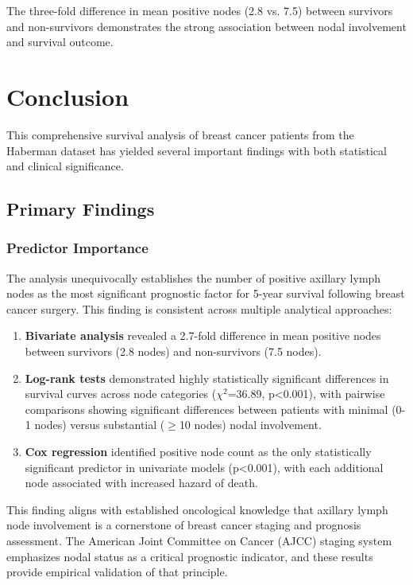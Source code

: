\documentclass[12pt,a4paper]{article}
\begin{document}
The three-fold difference in mean positive nodes (2.8 vs. 7.5) between survivors and non-survivors demonstrates the strong association between nodal involvement and survival outcome.


\section{Conclusion}

This comprehensive survival analysis of breast cancer patients from the Haberman dataset has yielded several important findings with both statistical and clinical significance.

\subsection{Primary Findings}

\subsubsection{Predictor Importance}

The analysis unequivocally establishes the number of positive axillary lymph nodes as the most significant prognostic factor for 5-year survival following breast cancer surgery. This finding is consistent across multiple analytical approaches:

\begin{enumerate}
    \item \textbf{Bivariate analysis} revealed a 2.7-fold difference in mean positive nodes between survivors (2.8 nodes) and non-survivors (7.5 nodes).
    
    \item \textbf{Log-rank tests} demonstrated highly statistically significant differences in survival curves across node categories ($\chi^2$=36.89, p<0.001), with pairwise comparisons showing significant differences between patients with minimal (0-1 nodes) versus substantial ($\geq$10 nodes) nodal involvement.
    
    \item \textbf{Cox regression} identified positive node count as the only statistically significant predictor in univariate models (p<0.001), with each additional node associated with increased hazard of death.
\end{enumerate}

This finding aligns with established oncological knowledge that axillary lymph node involvement is a cornerstone of breast cancer staging and prognosis assessment. The American Joint Committee on Cancer (AJCC) staging system emphasizes nodal status as a critical prognostic indicator, and these results provide empirical validation of that principle.
\end{document}
